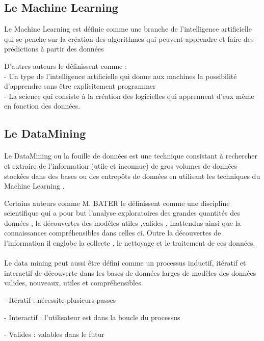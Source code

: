 \subsection{Le Machine Learning}
Le Machine Learning est définie comme une branche de l'intelligence artificielle qui se penche sur la création des algorithmes qui peuvent apprendre et faire des prédictions à partir des données\cite{DMandMLBook}

D'autres auteurs le définissent comme : \\
- Un type de l'intelligence artificielle qui donne aux machines la possibilité d'apprendre sans être explicitement programmer\cite{differenceMLDM2}  \\
- La science qui consiste à la création des logicielles qui apprennent d'eux même en fonction des données.\cite{differenceMLDM2}
\subsection{Le DataMining}
\paragraph{}
Le DataMining ou la  fouille de données est une technique  consistant à rechercher et extraire de l'information (utile et inconnue) de gros volumes de données stockées dans des bases ou des entrepôts de données en utilisant les techniques du Machine Learning .\cite{DMandMLBook}

Certains auteurs comme M. BATER\cite{MBaterBook} le définissent comme  une discipline scientifique qui a pour but l'analyse exploratoires des grandes quantités des données , la découvertes des modèles utiles ,valides , inattendus ainsi que  la connaissances compréhensibles dans celles ci. Outre la découvertes de l'information il englobe la collecte , le nettoyage et le traitement de ces données.
\paragraph{}
Le data mining peut aussi être défini comme un processus inductif, itératif  et interactif de découverte dans les bases de données  larges de modèles des données valides, nouveaux, utiles et compréhensibles.\cite{DMdef}

- 	Itératif :     nécessite plusieurs passes

- 	Interactif :   l'utilisateur est dans la boucle du processus

- 	Valides :     valables dans le futur

